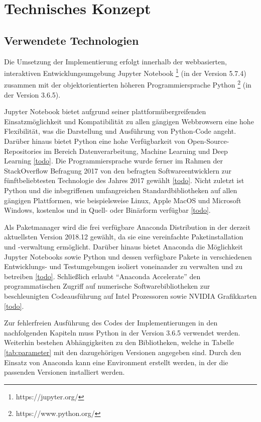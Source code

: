 \chapter{Technisches Konzept}
\section{Verwendete Technologien}
Die Umsetzung der Implementierung erfolgt innerhalb der webbasierten, interaktiven Entwicklungsumgebung Jupyter Notebook \footnote{https://jupyter.org/} (in der Version 5.7.4) zusammen mit der objektorientierten höheren Programmiersprache Python \footnote{https://www.python.org/} (in der Version 3.6.5).


Jupyter Notebook bietet aufgrund seiner plattformübergreifenden Einsatzmöglichkeit und Kompatibilität zu allen gängigen Webbrowsern eine hohe Flexibilität, was die Darstellung und Ausführung von Python-Code angeht. Darüber hinaus bietet Python eine hohe Verfügbarkeit von Open-Source-Repositories im Bereich Datenverarbeitung, Machine Learning und Deep Learning \ref{todo}. Die Programmiersprache wurde ferner im Rahmen der StackOverflow Befragung 2017 von den befragten Softwareentwicklern zur fünftbeliebtesten Technologie des Jahres 2017 gewählt \ref{todo}. Nicht zuletzt ist Python und die inbegriffenen umfangreichen Standardbibliotheken auf allen gängigen Plattformen, wie beispielsweise Linux, Apple MacOS und Microsoft Windows, kostenlos und in Quell- oder Binärform verfügbar \ref{todo}.


Als Paketmanager wird die frei verfügbare Anaconda Distribution in der derzeit aktuellsten Version 2018.12 gewählt, da sie eine vereinfachte Paketinstallation und -verwaltung ermöglicht. Darüber hinaus bietet Anaconda die Möglichkeit Jupyter Notebooks sowie Python und dessen verfügbare Pakete in verschiedenen Entwicklungs- und Testumgebungen isoliert voneinander zu verwalten und zu betreiben \ref{todo}. Schließlich erlaubt “Anaconda Accelerate” den programmatischen Zugriff auf numerische Softwarebibliotheken zur beschleunigten Codeausführung auf Intel Prozessoren sowie NVIDIA Grafikkarten \ref{todo}.


Zur fehlerfreien Ausführung des Codes der Implementierungen in den nachfolgenden Kapiteln muss Python in der Version 3.6.5 verwendet werden. Weiterhin bestehen Abhängigkeiten zu den Bibliotheken, welche in Tabelle \ref{tab:parameter} mit den dazugehörigen Versionen angegeben sind. Durch den Einsatz von Anaconda kann eine Environment erstellt werden, in der die passenden Versionen installiert werden.


